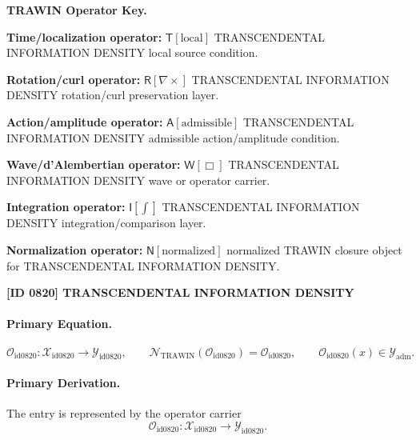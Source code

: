 \par\vspace{0.45\baselineskip}
\noindent\begin{minipage}[t]{\linewidth}
\begingroup
\small
\raggedright
\textbf{TRAWIN Operator Key.}\par
\noindent\textbf{Time/localization operator:} $\mathsf{T}\!\left[\mathrm{local}\right]$ TRANSCENDENTAL INFORMATION DENSITY local source condition.\par
\noindent\textbf{Rotation/curl operator:} $\mathsf{R}\!\left[\nabla\times\right]$ TRANSCENDENTAL INFORMATION DENSITY rotation/curl preservation layer.\par
\noindent\textbf{Action/amplitude operator:} $\mathsf{A}\!\left[\mathrm{admissible}\right]$ TRANSCENDENTAL INFORMATION DENSITY admissible action/amplitude condition.\par
\noindent\textbf{Wave/d'Alembertian operator:} $\mathsf{W}\!\left[\Box\right]$ TRANSCENDENTAL INFORMATION DENSITY wave or operator carrier.\par
\noindent\textbf{Integration operator:} $\mathsf{I}\!\left[\int\right]$ TRANSCENDENTAL INFORMATION DENSITY integration/comparison layer.\par
\noindent\textbf{Normalization operator:} $\mathsf{N}\!\left[\mathrm{normalized}\right]$ normalized TRAWIN closure object for TRANSCENDENTAL INFORMATION DENSITY.\par
\endgroup
\end{minipage}

\clearpage
\noindent\textbf{[ID 0820] TRANSCENDENTAL INFORMATION DENSITY}\par
\vspace{0.35em}
\paragraph{Primary Equation.}
\[
\mathcal{O}_{\mathrm{id0820}}:\mathcal{X}_{\mathrm{id0820}}\longrightarrow \mathcal{Y}_{\mathrm{id0820}},\qquad
\mathcal{N}_{\mathrm{TRAWIN}}(\mathcal{O}_{\mathrm{id0820}})=\mathcal{O}_{\mathrm{id0820}},\qquad
\mathcal{O}_{\mathrm{id0820}}(x)\in\mathcal{Y}_{\mathrm{adm}}.
\]

\paragraph{Primary Derivation.} The entry is represented by the operator carrier\[
\mathcal{O}_{\mathrm{id0820}}:\mathcal{X}_{\mathrm{id0820}}\longrightarrow \mathcal{Y}_{\mathrm{id0820}}.
\]


